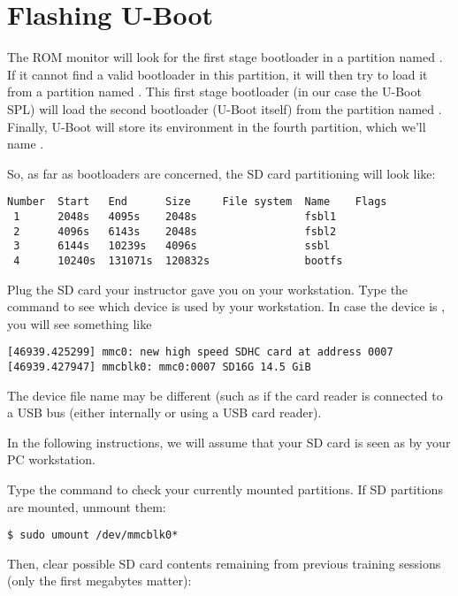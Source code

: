 \section{Flashing U-Boot}

The ROM monitor will look for the first stage bootloader in a
partition named . If it cannot find a valid bootloader in
this partition, it will then try to load it from a partition named
. This first stage bootloader (in our case the U-Boot SPL)
will load the second bootloader (U-Boot itself) from the partition
named . Finally, U-Boot will store its environment in the
fourth partition, which we'll name .

So, as far as bootloaders are concerned, the SD card partitioning will
look like:

\begin{verbatim}
Number  Start   End      Size     File system  Name    Flags
 1      2048s   4095s    2048s                 fsbl1
 2      4096s   6143s    2048s                 fsbl2
 3      6144s   10239s   4096s                 ssbl
 4      10240s  131071s  120832s               bootfs
\end{verbatim}

Plug the SD card your instructor gave you on your workstation. Type
the  command to see which device is used by your
workstation. In case the device is , you will see
something like

\begin{verbatim}
[46939.425299] mmc0: new high speed SDHC card at address 0007
[46939.427947] mmcblk0: mmc0:0007 SD16G 14.5 GiB
\end{verbatim}

The device file name may be different (such as 
if the card reader is connected to a USB bus (either internally
or using a USB card reader).

In the following instructions, we will assume that your SD card is
seen as  by your PC workstation.

Type the  command to check your currently mounted
partitions. If SD partitions are mounted, unmount them:

\begin{verbatim}
$ sudo umount /dev/mmcblk0*
\end{verbatim}

Then, clear possible SD card contents remaining from previous
training sessions (only the first megabytes matter):

